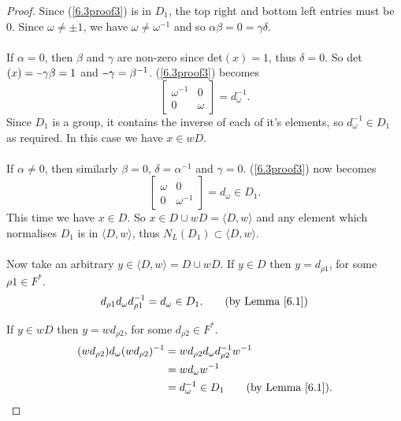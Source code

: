 \documentclass[a4paper , 11pt]{book}
\newcommand{\minus}{\scalebox{0.75}[1.0]{$-$}}
\theoremstyle{definition}
\theoremstyle{remark}
\begin{document}
\begin{proof}
Since (\ref{6.3proof3}) is in $D_1$, the top right and bottom left entries must be 0. Since  $\omega \neq \pm 1$, we have $\omega \neq \omega^{-1}$ and so $\alpha \beta = 0 = \gamma \delta$. \\
\\
\textbullet \space If $\alpha = 0$, then $\beta$ and $\gamma$ are non-zero since det$(x) = 1$, thus $\delta = 0$. So det$(x) = \minus \gamma \beta = 1$  and $\minus \gamma = \beta^{-1}$. (\ref{6.3proof3}) becomes $$\begin{bmatrix} \omega^{-1} & 0 \\ 0 & \omega \end{bmatrix} = d^{-1}_\omega.$$Since $D_1$ is a group, it contains the inverse of each of it's elements, so $d^{-1}_\omega \in D_1$ as required. In this case we have $x \in wD$. \\
\\
\textbullet \space If $\alpha \neq 0$, then similarly $\beta = 0$, $\delta = \alpha^{-1}$ and $\gamma = 0$. (\ref{6.3proof3}) now becomes $$\begin{bmatrix} \omega & 0 \\ 0 & \omega^{-1} \end{bmatrix} = d_\omega \in D_1.$$This time we have $x \in D$. So $x \in D \cup wD = \langle D , w \rangle$ and any element which normalises $D_1$ is in $\langle D , w \rangle$, thus $N_L(D_1) \subset \langle D , w \rangle$. \\
\\
Now take an arbitrary $y \in \langle D , w \rangle = D \cup wD$. If $y \in D$ then $y = d_{\rho 1}$, for some $\rho 1 \in F^*$.
\begin{align*} d_{\rho 1} d_\omega d^{-1}_{\rho 1} = d_\omega \in D_1. \tag{by Lemma \ref{6.1}}
\end{align*}

If $y \in wD$ then $y = w d_{\rho 2}$, for some $ d_{\rho 2} \in F^*$.
\begin{align*} (w d_{\rho 2}) d_\omega (w d_{\rho 2})^{-1} &= w d_{\rho 2} d_\omega d^{-1}_{\rho 2} w^{-1}
\\ &= w d_\omega w^{-1}
\\ &= d^{-1}_\omega \in D_1 \tag{by Lemma \ref{6.1}}.
\end{align*}


\end{proof}
\end{document}
